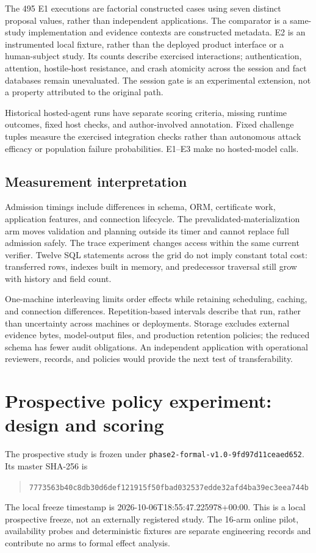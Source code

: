 \documentclass[11pt,a4paper]{article}
\newcommand{\code}[1]{\nolinkurl{#1}}
\begin{document}
The 495 E1 executions are factorial constructed cases using seven distinct proposal values, rather than independent applications. The comparator is a same-study implementation and evidence contexts are constructed metadata. E2 is an instrumented local fixture, rather than the deployed product interface or a human-subject study. Its counts describe exercised interactions; authentication, attention, hostile-host resistance, and crash atomicity across the session and fact databases remain unevaluated. The session gate is an experimental extension, not a property attributed to the original path.

Historical hosted-agent runs have separate scoring criteria, missing runtime outcomes, fixed host checks, and author-involved annotation. Fixed challenge tuples measure the exercised integration checks rather than autonomous attack efficacy or population failure probabilities. E1--E3 make no hosted-model calls.

\subsection{Measurement interpretation}

Admission timings include differences in schema, ORM, certificate work, application features, and connection lifecycle. The prevalidated-materialization arm moves validation and planning outside its timer and cannot replace full admission safely. The trace experiment changes access within the same current verifier. Twelve SQL statements across the grid do not imply constant total cost: transferred rows, indexes built in memory, and predecessor traversal still grow with history and field count.

One-machine interleaving limits order effects while retaining scheduling, caching, and connection differences. Repetition-based intervals describe that run, rather than uncertainty across machines or deployments. Storage excludes external evidence bytes, model-output files, and production retention policies; the reduced schema has fewer audit obligations. An independent application with operational reviewers, records, and policies would provide the next test of transferability.


\section{Prospective policy experiment: design and scoring}
\label{app:phase2-design}
The prospective study is frozen under \code{phase2-formal-v1.0-9fd97d11ceaed652}. Its master SHA-256 is
\begin{quote}\footnotesize\code{7773563b40c8db30d6def121915f50fbad032537edde32afd4ba39ec3eea744b}\end{quote}
The local freeze timestamp is 2026-10-06T18:55:47.225978+00:00. This is a local prospective freeze, not an externally registered study. The 16-arm online pilot, availability probes and deterministic fixtures are separate engineering records and contribute no arms to formal effect analysis.
\end{document}
